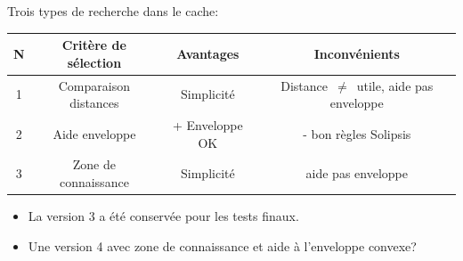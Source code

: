 \documentclass{beamer}
\begin{document}
  \begin{frame}
	Trois types de recherche dans le cache:
	\vspace{3mm}
	\tiny{
	\begin{table}
  		\begin{center}
    		 \begin{tabular}{|c|c|c|c|}
      		 \hline
      		 N & Critère de sélection & Avantages & Inconvénients\\
      		 \hline
        	 1 & Comparaison distances & Simplicité & Distance~$\ne$~utile, aide pas enveloppe\\
        	 2 & Aide enveloppe & + Enveloppe OK & - bon règles Solipsis\\
        	 3 & Zone de connaissance & Simplicité & aide pas enveloppe\\
      		 \hline
    		 \end{tabular}
  		\end{center}
	\end{table}
	}
	\begin{itemize}
		\item La version 3 a été conservée pour les tests finaux.
		\item Une version 4 avec zone de connaissance et aide à l'enveloppe convexe?

	\end{itemize}

  \end{frame}
 
  \begin{frame}\addtocounter{framenumber}{-1}
  \end{frame}
	
\end{document}
